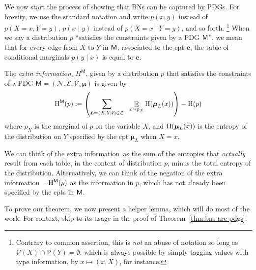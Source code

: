 \documentclass{article}
\newcommand{\bmu}{\boldsymbol{\mu}}
\newcommand{\V}{\mathcal V}
\newcommand{\N}{\mathcal N}
\newcommand{\Ed}{\mathcal E}
\newcommand{\sfM}{\mathsf M}
\def\mnvars[#1]{(\N#1, \Ed#1, \V#1, \bmu#1)}
\def\extrainfo{extra information}
\begin{document}
We now start the process of showing that BNs can be captured by PDGs. 
For brevity, we use the standard notation and write $p(x, y)$ instead of $p(X \!=\! x, Y \!=\! y)$, $p(x \mid y)$ instead of $p(X \!=\! x\mid Y \!=\! y)$, and so forth.%
	\footnote{Contrary to common assertion, this is \emph{not} an abuse of notation so long as $\mathcal V(X) \cap \mathcal V(Y) = \emptyset$, which is always possible by simply tagging values with type information, by $x \mapsto (x, X)$, for instance.}   
When we say a distribution $p$ ``satisfies the constraints given by a PDG $\sf M$'', we mean that for every edge from $X$ to $Y$ in $\sf M$, associated to the cpt $\mathbf e$, the table of conditional marginals $p(y \mid x)$ is equal to $\mathbf e$.
	
\begin{defn}
	The \emph{\extrainfo}, $H^{\sfM}$, given by a distribution $p$ that satisfies the constraints of a PDG $\sfM = \mnvars[]$ is given by
	\[ \H^{\sfM}(p) := \left(\sum_{L = (X,Y, \ell)\in \cal L} ~~\E_{x \sim p_X}  \H (\bmu_L (x)) \right) - \H(p) \] 
	where $p_X$ is the marginal of $p$ on the variable $X$, and $\H(\bmu_L(x))$ is the entropy of the distribution on $Y$ specified by the cpt $\bmu_L$ when $X = x$. 
\end{defn}
We can think of the \extrainfo\ as the sum of the entropies that \emph{actually} result from each table, in the context of distribution $p$, minus the total entropy of the distribution.
Alternatively, we can think of the negation of the \extrainfo\, $-\H^\sfM(p)$ as the information in $p$, which has not already been specified by the cpts in $\sf M$.

To prove our theorem, we now present a helper lemma, which will do most of the work. For context, skip to its usage in the proof of Theorem~\ref{thm:bns-are-pdgs}.
\end{document}
